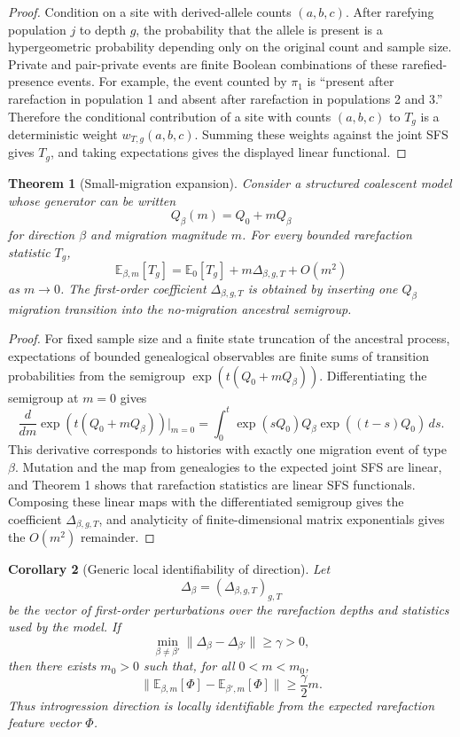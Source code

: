 \documentclass[11pt]{article}
\theoremstyle{plain}
\newtheorem{thm}{Theorem}[section]
\newtheorem{cor}[thm]{Corollary}
\theoremstyle{definition}
\theoremstyle{remark}
\begin{document}
\begin{proof}
Condition on a site with derived-allele counts \((a,b,c)\). After rarefying population
\(j\) to depth \(g\), the probability that the allele is present is a hypergeometric
probability depending only on the original count and sample size. Private and
pair-private events are finite Boolean combinations of these rarefied-presence events. For
example, the event counted by \(\pi_1\) is ``present after rarefaction in population 1 and
absent after rarefaction in populations 2 and 3.'' Therefore the conditional contribution
of a site with counts \((a,b,c)\) to \(T_g\) is a deterministic weight
\(w_{T,g}(a,b,c)\). Summing these weights against the joint SFS gives \(T_g\), and taking
expectations gives the displayed linear functional.
\end{proof}

\begin{thm}[Small-migration expansion]\label{thm:expansion}
Consider a structured coalescent model whose generator can be written
\[
Q_\beta(m)=Q_0+mQ_\beta
\]
for direction \(\beta\) and migration magnitude \(m\). For every bounded rarefaction
statistic \(T_g\),
\[
\mathbb{E}_{\beta,m}[T_g]=\mathbb{E}_{0}[T_g]+m\Delta_{\beta,g,T}+O(m^2)
\]
as \(m\to 0\). The first-order coefficient \(\Delta_{\beta,g,T}\) is obtained by inserting
one \(Q_\beta\) migration transition into the no-migration ancestral semigroup.
\end{thm}

\begin{proof}
For fixed sample size and a finite state truncation of the ancestral process, expectations
of bounded genealogical observables are finite sums of transition probabilities from the
semigroup \(\exp(t(Q_0+mQ_\beta))\). Differentiating the semigroup at \(m=0\) gives
\[
\frac{d}{dm}\exp(t(Q_0+mQ_\beta))\bigg|_{m=0}
=\int_0^t \exp(sQ_0)Q_\beta\exp((t-s)Q_0)\,ds .
\]
This derivative corresponds to histories with exactly one migration event of type
\(\beta\). Mutation and the map from genealogies to the expected joint SFS are linear, and
Theorem 1 shows that rarefaction statistics are linear SFS functionals. Composing these
linear maps with the differentiated semigroup gives the coefficient
\(\Delta_{\beta,g,T}\), and analyticity of finite-dimensional matrix exponentials gives
the \(O(m^2)\) remainder.
\end{proof}

\begin{cor}[Generic local identifiability of direction]\label{cor:identifiability}
Let
\[
\Delta_\beta=(\Delta_{\beta,g,T})_{g,T}
\]
be the vector of first-order perturbations over the rarefaction depths and statistics
used by the model. If
\[
\min_{\beta\ne\beta'}\|\Delta_\beta-\Delta_{\beta'}\| \ge \gamma>0,
\]
then there exists \(m_0>0\) such that, for all \(0<m<m_0\),
\[
\|\mathbb{E}_{\beta,m}[\Phi]-\mathbb{E}_{\beta',m}[\Phi]\|
\ge \frac{\gamma}{2}m .
\]
Thus introgression direction is locally identifiable from the expected rarefaction feature
vector \(\Phi\).
\end{cor}
\end{document}
